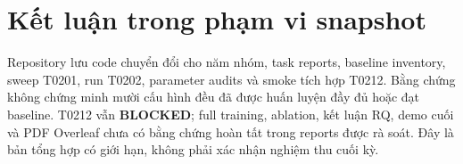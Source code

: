 \section{Kết luận trong phạm vi snapshot}
Repository lưu code chuyển đổi cho năm nhóm, task reports, baseline inventory, sweep T0201, run T0202, parameter audits và smoke tích hợp T0212. Bằng chứng không chứng minh mười cấu hình đều đã được huấn luyện đầy đủ hoặc đạt baseline. T0212 vẫn \textbf{BLOCKED}; full training, ablation, kết luận RQ, demo cuối và PDF Overleaf chưa có bằng chứng hoàn tất trong reports được rà soát. Đây là bản tổng hợp có giới hạn, không phải xác nhận nghiệm thu cuối kỳ.